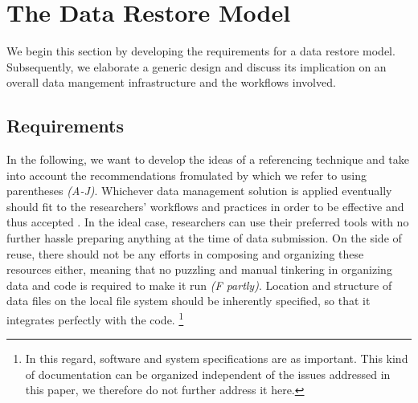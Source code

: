 \documentclass{sig-alternate}
\begin{document}
\section{The Data Restore Model}\label{sec:datareferencing}

We begin this section by developing the requirements for a data restore model.
Subsequently, we elaborate a generic design and discuss its implication on an overall data mangement infrastructure and the workflows involved.


\subsection{Requirements}\label{sec:req}

In the following, we want to develop the ideas of a referencing technique and take into account the recommendations fromulated by \cite{RePEc_ejw_journl_v_4_y_2007_i_3_p_326_337} which we refer to using parentheses \textit{(A-J)}.
Whichever data management solution is applied eventually should fit to the researchers' workflows and practices in order to be effective and thus accepted \cite{Feijen_2011}.
In the ideal case, researchers can use their preferred tools with no further hassle preparing anything at the time of data submission.
%
On the side of reuse, there should not be any efforts in composing and organizing these resources either, meaning that no puzzling and manual tinkering in organizing data and code is required to make it run \textit{(F partly)}.
Location and structure of data files on the local file system should be inherently specified, so that it integrates perfectly with the code.
\footnote{In this regard, software and system specifications are as important. This kind of documentation can be organized independent of the issues addressed in this paper, we therefore do not further address it here.}
  
\end{document}
